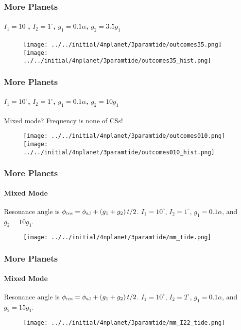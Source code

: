 \documentclass[dvipsnames]{beamer}
\newcommand*{\p}[1]{\left(#1\right)}
\begin{document}
\begin{frame}
    \frametitle{More Planets}
    \framesubtitle{$I_1 = 10^\circ$, $I_2 = 1^\circ$, $g_1 = 0.1 \alpha$,
        $g_2 = 3.5g_1$}

    \begin{figure}
        \centering
        \texttt{[image: ../../initial/4nplanet/3paramtide/outcomes35.png]}
        \texttt{[image: ../../initial/4nplanet/3paramtide/outcomes35\_hist.png]}
    \end{figure}
\end{frame}

\begin{frame}
    \frametitle{More Planets}
    \framesubtitle{$I_1 = 10^\circ$, $I_2 = 1^\circ$, $g_1 = 0.1 \alpha$,
        $g_2 = 10g_1$}

    Mixed mode? Frequency is none of CSs!
    \begin{figure}
        \centering
        \texttt{[image: ../../initial/4nplanet/3paramtide/outcomes010.png]}
        \texttt{[image: ../../initial/4nplanet/3paramtide/outcomes010\_hist.png]}
    \end{figure}
\end{frame}

\begin{frame}
    \frametitle{More Planets}
    \framesubtitle{Mixed Mode}

    Resonance angle is $\phi_{\rm res} = \phi_{\rm sJ} + \p{g_1 + g_2}t/2$. $I_1
    = 10^\circ$, $I_2 = 1^\circ$, $g_1 = 0.1 \alpha$, and $g_2 = 10g_1$.
    \begin{figure}
        \centering
        \texttt{[image: ../../initial/4nplanet/3paramtide/mm\_tide.png]}
    \end{figure}
\end{frame}

\begin{frame}
    \frametitle{More Planets}
    \framesubtitle{Mixed Mode}

    Resonance angle is $\phi_{\rm res} = \phi_{\rm sJ} + \p{g_1 + g_2}t/2$. $I_1
    = 10^\circ$, $I_2 = 2^\circ$, $g_1 = 0.1 \alpha$, and $g_2 = 15g_1$.
    \begin{figure}
        \centering
        \texttt{[image: ../../initial/4nplanet/3paramtide/mm\_I22\_tide.png]}
    \end{figure}
\end{frame}
\end{document}
